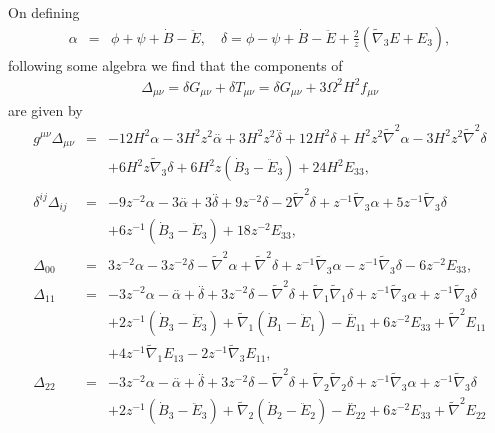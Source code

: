 On defining
%
\begin{eqnarray}
\alpha &=& \phi +\psi+\dot B - \ddot E, \quad \delta = \phi -\psi + \dot B - \ddot E + \frac{2}{z}(\tilde\nabla_3 E + E_3),
\label{14.3}
\end{eqnarray}
%
following some algebra we find that the components of 
\begin{eqnarray}
\Delta_{\mu\nu}=\delta G_{\mu\nu}+\delta T_{\mu\nu}=\delta G_{\mu\nu}+ 3\Omega^2 H^2 f_{\mu\nu}
\end{eqnarray}
are given by 
\begin{eqnarray}
g^{\mu\nu}\Delta_{\mu\nu}&=& -12 H^2 \alpha - 3 H^2 z^2 \overset{..}{\alpha} + 3 H^2 z^2 \overset{..}{\delta} + 12 H^2 \delta + H^2 z^2 \tilde\nabla^{2}{}\alpha - 3 H^2 z^2 \tilde\nabla^{2}{}\delta 
\nonumber \\ 
&& + 6 H^2 z \tilde{\nabla}_{3}\delta +6 H^2 z (\dot{B}_3-\ddot{E}_3)+24 H^2 E_{33},
\nonumber\\ 
\delta^{ij}\Delta_{ij}&=& -9 z^{-2} \alpha - 3 \overset{..}{\alpha} + 3 \overset{..}{\delta} + 9 z^{-2} \delta - 2 \tilde\nabla^{2}{}\delta + z^{-1} \tilde{\nabla}_{3}\alpha + 5 z^{-1} \tilde{\nabla}_{3}\delta 
\nonumber\\
&&+6 z^{-1} (\dot{B}_3-\ddot{E}_3)+18 z^{-2} E_{33},
\nonumber\\ 
\Delta_{00}&=& 3 z^{-2} \alpha - 3 z^{-2} \delta -  \tilde\nabla^{2}{}\alpha + \tilde\nabla^{2}{}\delta + z^{-1} \tilde{\nabla}_{3}\alpha -  z^{-1} \tilde{\nabla}_{3}\delta -6 z^{-2} E_{33},
\nonumber\\ 
\Delta_{11}&=& -3 z^{-2} \alpha -  \overset{..}{\alpha} + \overset{..}{\delta} + 3 z^{-2} \delta -  \tilde\nabla^{2}{}\delta + \tilde{\nabla}_{1}\tilde{\nabla}_{1}\delta + z^{-1} \tilde{\nabla}_{3}\alpha + z^{-1} \tilde{\nabla}_{3}\delta 
\nonumber\\
&&+2 z^{-1} (\dot{B}_3-\ddot{E}_3) + \tilde{\nabla}_{1}(\dot{B}_1-\ddot{E}_1)
- \overset{..}{E}_{11} + 6 z^{-2} E_{33} + \tilde\nabla^{2}{}E_{11} 
\nonumber\\
&&+ 4 z^{-1} \tilde{\nabla}_{1}E_{13} - 2 z^{-1} \tilde{\nabla}_{3}E_{11},
\nonumber\\ 
\Delta_{22}&=& -3 z^{-2} \alpha -  \overset{..}{\alpha} + \overset{..}{\delta} + 3 z^{-2} \delta -  \tilde\nabla^{2}{}\delta + \tilde{\nabla}_{2}\tilde{\nabla}_{2}\delta + z^{-1} \tilde{\nabla}_{3}\alpha + z^{-1} \tilde{\nabla}_{3}\delta 
\nonumber\\
&&+2 z^{-1} (\dot{B}_3-\ddot{E}_3) + \tilde{\nabla}_{2}(\dot{B}_2-\ddot{E}_2)  - \overset{..}{E}_{22}+ 6 z^{-2} E_{33} + \tilde\nabla^{2}{}E_{22} 

\end{eqnarray}
